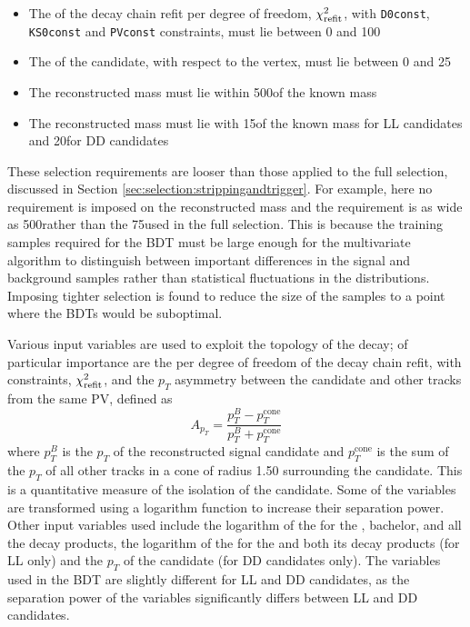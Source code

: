 \begin{itemize}
\item The \chisq of the decay chain refit per degree of freedom, $\chi^2_\text{refit}$, with {\tt D0const}, {\tt KS0const} and {\tt PVconst} constraints, must lie between 0 and 100
\item The \chisqip of the \Bm candidate, with respect to the \Bm vertex, must lie between 0 and 25
\item The reconstructed \Kstarm mass must lie within 500\mevcc of the known \Kstarm mass
\item The reconstructed \KS mass must lie with 15\mevcc of the known \KS mass for LL candidates and 20\mevcc for DD candidates
\end{itemize}
These selection requirements are looser than those applied to the full selection, discussed in Section \ref{sec:selection:strippingandtrigger}. For example, here no requirement is imposed on the reconstructed \Dz mass and the \Kstarm requirement is as wide as 500\mevcc rather than the 75\mevcc used in the full selection. This is because the training samples required for the BDT must be large enough for the multivariate algorithm to distinguish between important differences in the signal and background samples rather than statistical fluctuations in the distributions. Imposing tighter selection is found to reduce the size of the samples to a point where the BDTs would be suboptimal.

Various input variables are used to exploit the topology of the decay; of particular importance are the \chisq per degree of freedom of the decay chain refit, with constraints, $\chi^2_\text{refit}$, and the $p_T$ asymmetry between the \Bm candidate and other tracks from the same PV, defined as
\begin{equation}
A_{p_T} = \frac{p_T^B - p_T^{\text{cone}}}{p_T^B + p_T^{\text{cone}}}
\label{ptasy}
\end{equation}
where $p_T^B$ is the $p_T$ of the reconstructed \Bm signal candidate and $p_T^{\text{cone}}$ is the sum of the $p_T$ of all other tracks in a cone of radius 1.50 surrounding the \Bm candidate. This is a quantitative measure of the isolation of the \Bm candidate. Some of the variables are transformed using a logarithm function to increase their separation power. Other input variables used include the logarithm of the \chisqip for the \Bm, bachelor, \Dz and all the \Dz decay products, the logarithm of the \chisqip for the \KS and both its decay products (for LL only) and the $p_T$ of the \KS candidate (for DD candidates only). The variables used in the BDT are slightly different for LL and DD candidates, as the separation power of the \KS variables significantly differs between LL and DD candidates. 

